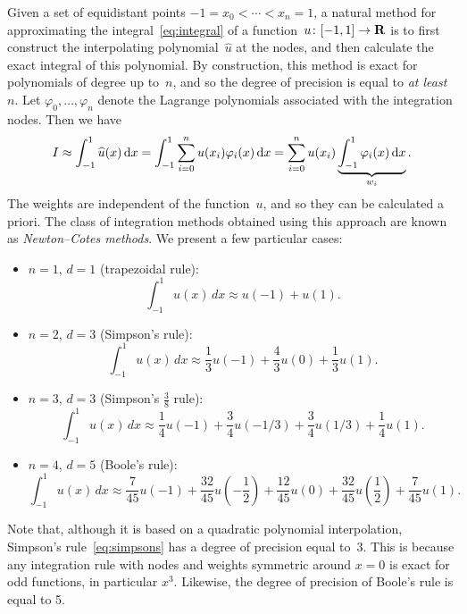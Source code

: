 Given a set of equidistant points $-1 = x_0 < \dotsb < x_n = 1$,
a natural method for approximating the integral~\eqref{eq:integral} of a function~$u\colon [-1, 1] \to \mathbf R$
is to first construct the interpolating polynomial~$\widehat u$ at the nodes,
and then calculate the exact integral of this polynomial.
By construction, this method is exact for polynomials of degree up to~$n$,
and so the degree of precision is equal to \emph{at least}~$n$.
Let $\varphi_0, \dotsc, \varphi_n$ denote the Lagrange polynomials associated with the integration nodes.
Then we have
\[
    I \approx \int_{-1}^{1} \widehat u(x) \, \mathrm d x
    = \int_{-1}^{1} \sum_{i=0}^{n} u(x_i) \varphi_i (x) \, \mathrm d x
    = \sum_{i=0}^{n} u(x_i) \underbrace{\int_{-1}^{1}  \varphi_i (x)  \, \mathrm d x}_{w_i}.
\]
The weights are independent of the function~$u$,
and so they can be calculated a priori.
The class of integration methods obtained using this approach are known as \emph{Newton--Cotes methods}.
We present a few particular cases:
\begin{itemize}
    \item
        $n = 1$, $d = 1$ (trapezoidal rule):
        \begin{equation}
            \label{eq:trapezoidal_rule}
            \int_{-1}^{1} u(x) \, dx
            \approx u(-1) + u(1).
        \end{equation}

    \item
        $n = 2$, $d = 3$ (Simpson's rule):
        \begin{equation}
            \label{eq:simpsons}
            \int_{-1}^{1} u(x) \, dx
            \approx \frac{1}{3} u(-1) + \frac{4}{3} u(0) + \frac{1}{3} u(1).
        \end{equation}

    \item
        $n = 3$, $d = 3$ (Simpson's $\frac{3}{8}$ rule):
        \[
            \int_{-1}^{1} u(x) \, dx
            \approx \frac{1}{4} u(-1) + \frac{3}{4} u(-1/3) + \frac{3}{4} u(1/3) + \frac{1}{4} u(1).
        \]

    \item
        $n = 4$, $d = 5$ (Boole's rule):
        \[
            \int_{-1}^{1} u(x) \, dx
            \approx \frac{7}{45} u(-1) + \frac{32}{45} u\left(-\frac{1}{2}\right) + \frac{12}{45} u\left(0\right) + \frac{32}{45} u\left(\frac{1}{2}\right) + \frac{7}{45} u(1).
        \]
\end{itemize}

\begin{remark}
    Note that,
    although it is based on a quadratic polynomial interpolation,
    Simpson's rule~\eqref{eq:simpsons} has a degree of precision equal to~$3$.
    This is because any integration rule with nodes and weights symmetric around $x=0$ is exact for odd functions,
    in particular $x^3$.
    Likewise, the degree of precision of Boole's rule is equal to 5.
\end{remark}

